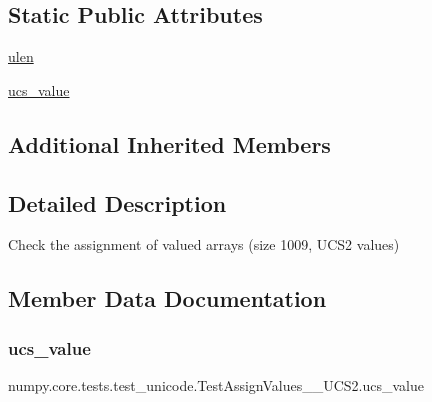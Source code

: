 \subsection*{Static Public Attributes}
\begin{DoxyCompactItemize}
\item 
\hyperlink{classnumpy_1_1core_1_1tests_1_1test__unicode_1_1TestAssignValues__1009__UCS2_ac61696aa7b6c200b85bb5f4b78a88ba3}{ulen}
\item 
\hyperlink{classnumpy_1_1core_1_1tests_1_1test__unicode_1_1TestAssignValues__1009__UCS2_a050dd81a7e63a478cd6a39465c7107d1}{ucs\+\_\+value}
\end{DoxyCompactItemize}
\subsection*{Additional Inherited Members}


\subsection{Detailed Description}
\begin{DoxyVerb}Check the assignment of valued arrays (size 1009, UCS2 values)\end{DoxyVerb}
 

\subsection{Member Data Documentation}
\mbox{\label{classnumpy_1_1core_1_1tests_1_1test__unicode_1_1TestAssignValues__1009__UCS2_a050dd81a7e63a478cd6a39465c7107d1}} 
\subsubsection{\texorpdfstring{ucs\+\_\+value}{ucs\_value}}
{\footnotesize\ttfamily numpy.\+core.\+tests.\+test\+\_\+unicode.\+Test\+Assign\+Values\+\_\+\_\+\+U\+C\+S2.\+ucs\+\_\+value\hspace{0.3cm}{\ttfamily [static]}}

